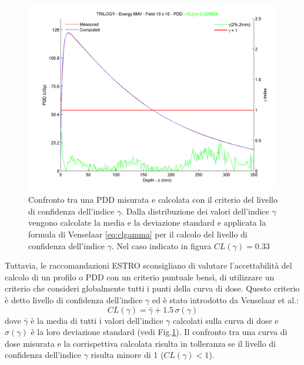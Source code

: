 \begin{figure}[!t]
\centering
\includegraphics[width=.9\textwidth]{./cap2/pdd10x10.png}
\caption{Confronto tra una PDD misurata e calcolata con il criterio del livello di confidenza dell'indice $\gamma$. Dalla distribuzione dei valori dell'indice $\gamma$ vengono calcolate la media e la deviazione standard e applicata la formula di Venselaar \eqref{eq:clgamma} per il calcolo del livello di confidenza dell'indice $\gamma$. Nel caso indicato in figura $CL(\gamma)=0.33$}
\label{fig:gamma10x10}
\end{figure}

Tuttavia, le raccomandazioni ESTRO sconsigliano di valutare l'accettabilità del calcolo di un profilo o PDD con un criterio puntuale bensì, di utilizzare un criterio che consideri globalmente tutti i punti della curva di dose. Questo criterio è detto livello di confidenza dell'indice $\gamma$ ed è stato introdotto da Venselaar et al.\cite{Venselaar2001}:
\begin{equation}
CL(\gamma) = \bar{\gamma} + 1.5\,\sigma(\gamma)
\label{eq:clgamma}
\end{equation}
dove $\bar{\gamma}$ è la media di tutti i valori dell'indice $\gamma$ calcolati sulla curva di dose e $\sigma(\gamma)$ è la loro deviazione standard (vedi Fig.\ref{fig:gamma10x10}).
Il confronto tra una curva di dose misurata e la corrispettiva calcolata risulta in tolleranza se il livello di confidenza dell'indice $\gamma$ risulta minore di 1 ($CL(\gamma) < 1$).


